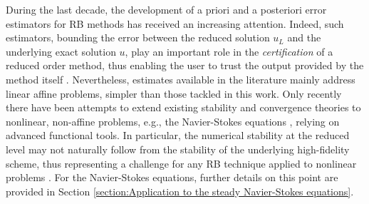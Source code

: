 \documentclass[12pt, a4paper, twoside, openright, notitlepage]{report}
\numberwithin{equation}{chapter}
\theoremstyle{theorem}
\theoremstyle{definition}
\theoremstyle{remark}
\theoremstyle{proposition}
\numberwithin{figure}{chapter}
\begin{document}
		During the last decade, the development of a priori and a posteriori error estimators for RB methods has received an increasing attention. Indeed, such estimators, bounding the error between the reduced solution $u_L$ and the underlying exact solution $u$, play an important role in the \emph{certification} of a reduced order method, thus enabling the user to trust the output provided by the method itself \cite{HSR16}. Nevertheless, estimates available in the literature mainly address linear affine problems, simpler than those tackled in this work. Only recently there have been attempts to extend existing stability and convergence theories to nonlinear, non-affine problems, e.g., the Navier-Stokes equations \cite{QMN15}, relying on advanced functional tools. In particular, the numerical stability at the reduced level may not naturally follow from the stability of the underlying high-fidelity scheme, thus representing a challenge for any RB technique applied to nonlinear problems \cite{Bal14}. For the Navier-Stokes equations, further details on this point are provided in Section \ref{section:Application to the steady Navier-Stokes equations}. 
		
				
\end{document}
